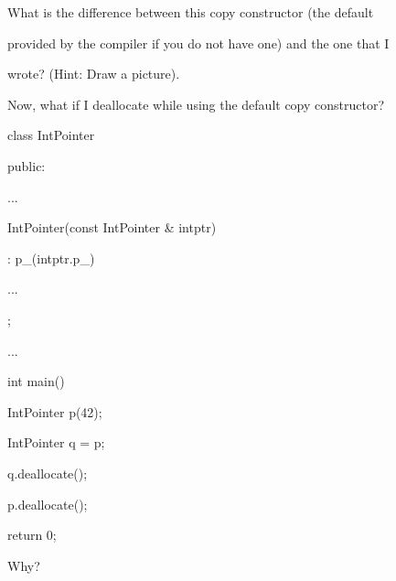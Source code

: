 What is the difference between this copy constructor (the default

provided by the compiler if you do not have one) and the one that I

wrote? (Hint: Draw a picture).



Now, what if I deallocate while using the default copy constructor?



\begin{consolethree}[escapeinside=||]

class IntPointer

{

public:

    ...

    IntPointer(const IntPointer & intptr)

        : p_(intptr.p_)

    {}

    ...

};

\end{consolethree}



\begin{consolethree}[escapeinside=||]

...

int main()

{

    IntPointer p(42);

    IntPointer q = p;

    q.deallocate();

    p.deallocate();

    return 0;

}

\end{consolethree}



Why?

